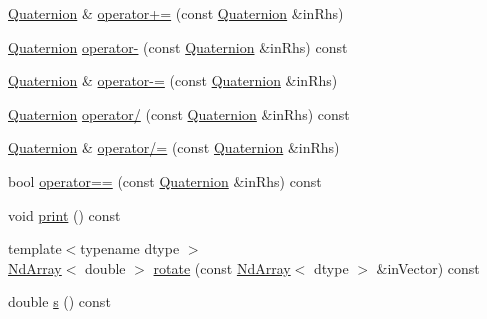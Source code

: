 \begin{DoxyCompactItemize}
\item 
\mbox{\hyperlink{class_num_c_1_1_rotations_1_1_quaternion}{Quaternion}} \& \mbox{\hyperlink{class_num_c_1_1_rotations_1_1_quaternion_a5dda8feb935b5b91a9446b368c6c6fc5}{operator+=}} (const \mbox{\hyperlink{class_num_c_1_1_rotations_1_1_quaternion}{Quaternion}} \&in\+Rhs)
\item 
\mbox{\hyperlink{class_num_c_1_1_rotations_1_1_quaternion}{Quaternion}} \mbox{\hyperlink{class_num_c_1_1_rotations_1_1_quaternion_ad8041e72f183b84584819b5ff94f6af1}{operator-\/}} (const \mbox{\hyperlink{class_num_c_1_1_rotations_1_1_quaternion}{Quaternion}} \&in\+Rhs) const
\item 
\mbox{\hyperlink{class_num_c_1_1_rotations_1_1_quaternion}{Quaternion}} \& \mbox{\hyperlink{class_num_c_1_1_rotations_1_1_quaternion_afa8e9844ce6cb62dbbb3301ede8bbf47}{operator-\/=}} (const \mbox{\hyperlink{class_num_c_1_1_rotations_1_1_quaternion}{Quaternion}} \&in\+Rhs)
\item 
\mbox{\hyperlink{class_num_c_1_1_rotations_1_1_quaternion}{Quaternion}} \mbox{\hyperlink{class_num_c_1_1_rotations_1_1_quaternion_a765710c6c32b22f4ae19ea0f77ae668e}{operator/}} (const \mbox{\hyperlink{class_num_c_1_1_rotations_1_1_quaternion}{Quaternion}} \&in\+Rhs) const
\item 
\mbox{\hyperlink{class_num_c_1_1_rotations_1_1_quaternion}{Quaternion}} \& \mbox{\hyperlink{class_num_c_1_1_rotations_1_1_quaternion_a2c8655a47ce6f85b0c181e257bc519ed}{operator/=}} (const \mbox{\hyperlink{class_num_c_1_1_rotations_1_1_quaternion}{Quaternion}} \&in\+Rhs)
\item 
bool \mbox{\hyperlink{class_num_c_1_1_rotations_1_1_quaternion_a5695d1bfb38cedffcc4e3f0769a1c9cd}{operator==}} (const \mbox{\hyperlink{class_num_c_1_1_rotations_1_1_quaternion}{Quaternion}} \&in\+Rhs) const
\item 
void \mbox{\hyperlink{class_num_c_1_1_rotations_1_1_quaternion_ac74bd4adb9f6c96b062a226d7f07420b}{print}} () const
\item 
{\footnotesize template$<$typename dtype $>$ }\\\mbox{\hyperlink{class_num_c_1_1_nd_array}{Nd\+Array}}$<$ double $>$ \mbox{\hyperlink{class_num_c_1_1_rotations_1_1_quaternion_a4fafcb2d64f0a9ef1f16f4b15a2324e7}{rotate}} (const \mbox{\hyperlink{class_num_c_1_1_nd_array}{Nd\+Array}}$<$ dtype $>$ \&in\+Vector) const
\item 
double \mbox{\hyperlink{class_num_c_1_1_rotations_1_1_quaternion_a5d3d13ed55c5e08fd35e3d793eb62a70}{s}} () const
\item 

\end{DoxyCompactItemize}
